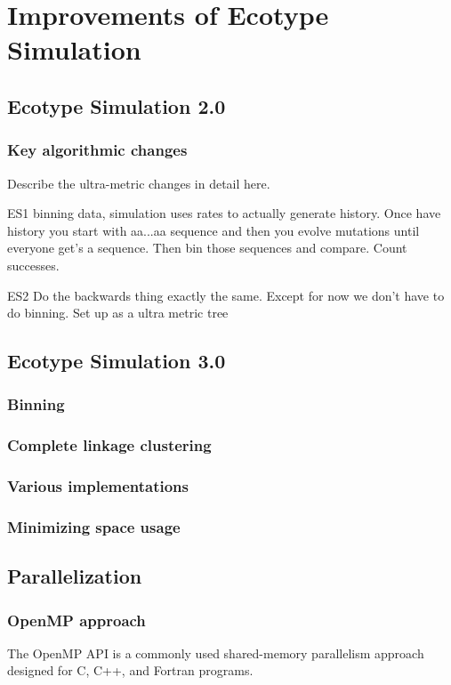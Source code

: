 \chapter{Improvements of Ecotype Simulation}
\section{Ecotype Simulation 2.0}
\subsection*{Key algorithmic changes}
Describe the ultra-metric changes in detail here.

ES1 binning data, simulation uses rates to actually generate history. Once have history you start with aa...aa sequence and then you evolve mutations until everyone get's a sequence. Then bin those sequences and compare. Count successes.


ES2 Do the backwards thing exactly the same. Except for now we don't have to do binning. Set up as a ultra metric tree



\section{Ecotype Simulation 3.0}
\subsection{Binning}
\subsection*{Complete linkage clustering}
\subsection*{Various implementations}
\subsection*{Minimizing space usage}
\section{Parallelization}
\subsection*{OpenMP approach}
The OpenMP API is a commonly used shared-memory parallelism approach designed for C, C++, and Fortran programs.

